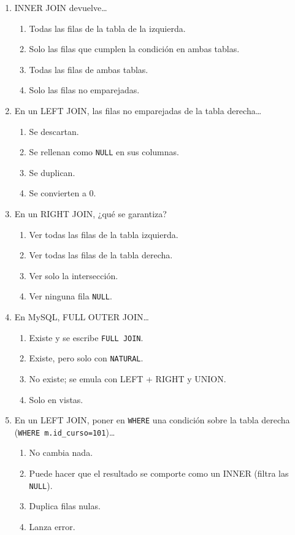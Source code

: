 \documentclass[11pt,a4paper]{article}
\begin{document}
\begin{enumerate}[label=\textbf{\arabic*.}]
\item INNER JOIN devuelve…
  \begin{enumerate}[label=\Alph*.]
    \item Todas las filas de la tabla de la izquierda.
    \item Solo las filas que cumplen la condición en ambas tablas.
    \item Todas las filas de ambas tablas.
    \item Solo las filas no emparejadas.
  \end{enumerate}

\item En un LEFT JOIN, las filas no emparejadas de la tabla derecha…
  \begin{enumerate}[label=\Alph*.]
    \item Se descartan.
    \item Se rellenan como \texttt{NULL} en sus columnas.
    \item Se duplican.
    \item Se convierten a 0.
  \end{enumerate}

\item En un RIGHT JOIN, ¿qué se garantiza?
  \begin{enumerate}[label=\Alph*.]
    \item Ver todas las filas de la tabla izquierda.
    \item Ver todas las filas de la tabla derecha.
    \item Ver solo la intersección.
    \item Ver ninguna fila \texttt{NULL}.
  \end{enumerate}

\item En MySQL, FULL OUTER JOIN…
  \begin{enumerate}[label=\Alph*.]
    \item Existe y se escribe \texttt{FULL JOIN}.
    \item Existe, pero solo con \texttt{NATURAL}.
    \item No existe; se emula con LEFT + RIGHT y UNION.
    \item Solo en vistas.
  \end{enumerate}

\item En un LEFT JOIN, poner en \texttt{WHERE} una condición sobre la tabla derecha (\texttt{WHERE m.id\_curso=101})…
  \begin{enumerate}[label=\Alph*.]
    \item No cambia nada.
    \item Puede hacer que el resultado se comporte como un INNER (filtra las \texttt{NULL}).
    \item Duplica filas nulas.
    \item Lanza error.
  \end{enumerate}


\end{enumerate}
\end{document}
